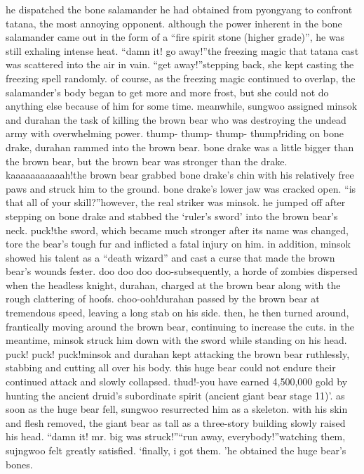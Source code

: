 he dispatched the bone salamander he had obtained from pyongyang to confront tatana, the most annoying opponent.
although the power inherent in the bone salamander came out in the form of a “fire spirit stone (higher grade)”, he was still exhaling intense heat.
“damn it! go away!”the freezing magic that tatana cast was scattered into the air in vain.
“get away!”stepping back, she kept casting the freezing spell randomly.
 of course, as the freezing magic continued to overlap, the salamander’s body began to get more and more frost, but she could not do anything else because of him for some time.
meanwhile, sungwoo assigned minsok and durahan the task of killing the brown bear who was destroying the undead army with overwhelming power.
thump- thump- thump- thump!riding on bone drake, durahan rammed into the brown bear.
 bone drake was a little bigger than the brown bear, but the brown bear was stronger than the drake.
kaaaaaaaaaaah!the brown bear grabbed bone drake’s chin with his relatively free paws and struck him to the ground.
 bone drake’s lower jaw was cracked open.
“is that all of your skill?”however, the real striker was minsok.
 he jumped off after stepping on bone drake and stabbed the ‘ruler’s sword’ into the brown bear’s neck.
puck!the sword, which became much stronger after its name was changed, tore the bear’s tough fur and inflicted a fatal injury on him.
in addition, minsok showed his talent as a “death wizard” and cast a curse that made the brown bear’s wounds fester.
doo doo doo doo-subsequently, a horde of zombies dispersed when the headless knight, durahan, charged at the brown bear along with the rough clattering of hoofs.
choo-ooh!durahan passed by the brown bear at tremendous speed, leaving a long stab on his side.
then, he then turned around, frantically moving around the brown bear, continuing to increase the cuts.
in the meantime, minsok struck him down with the sword while standing on his head.
puck! puck! puck!minsok and durahan kept attacking the brown bear ruthlessly, stabbing and cutting all over his body.
this huge bear could not endure their continued attack and slowly collapsed.
thud!-you have earned 4,500,000 gold by hunting the ancient druid’s subordinate spirit (ancient giant bear stage 11)’.
as soon as the huge bear fell, sungwoo resurrected him as a skeleton.
 with his skin and flesh removed, the giant bear as tall as a three-story building slowly raised his head.
“damn it! mr.
 big was struck!”“run away, everybody!”watching them, sujngwoo felt greatly satisfied.
‘finally, i got them.
’he obtained the huge bear’s bones.
